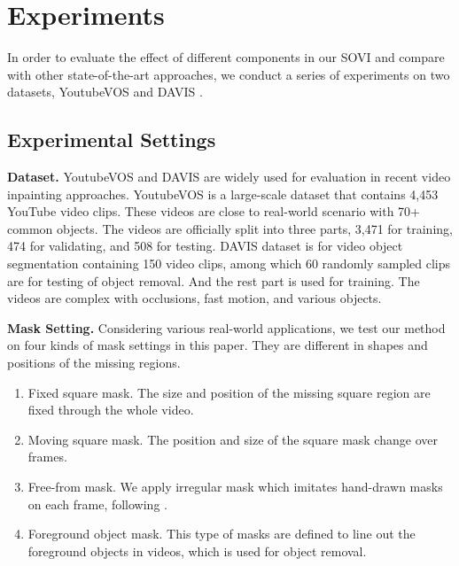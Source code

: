 \section{Experiments}


In order to evaluate the effect of different components in our SOVI and compare with other state-of-the-art approaches, we conduct a series of experiments on two datasets, YoutubeVOS \cite{xu2018youtube} and DAVIS \cite{davis_2017}.
\subsection{Experimental Settings}
\textbf{Dataset.} 
YoutubeVOS and DAVIS are widely used for evaluation in recent video inpainting approaches.
YoutubeVOS is a large-scale dataset that contains 4,453 YouTube video clips. These videos are close to real-world scenario with 70+ common objects. 
The videos are officially split into three parts, 3,471 for training, 474 for validating, and 508 for testing. 
DAVIS dataset is for video object segmentation containing 150 video clips, among which 60 randomly sampled clips are for testing of object removal. And the rest part is used for training.
The videos are complex with occlusions, fast motion, and various objects. 

\noindent \textbf{Mask Setting.} Considering various real-world applications, we test our method on four kinds of mask settings in this paper. 
They are different in shapes and positions of the missing regions.
\begin{enumerate}
	\item Fixed square mask. The size and position of the missing square region are fixed through the whole video. 
	\item Moving square mask. The position and size of the square mask change over frames. 
	\item Free-from mask. We apply irregular mask which imitates hand-drawn masks on each frame, following \cite{liu2018partialinpainting}. 
	\item Foreground object mask. This type of masks are defined to line out the foreground objects in videos, which is used for object removal.
\end{enumerate}


